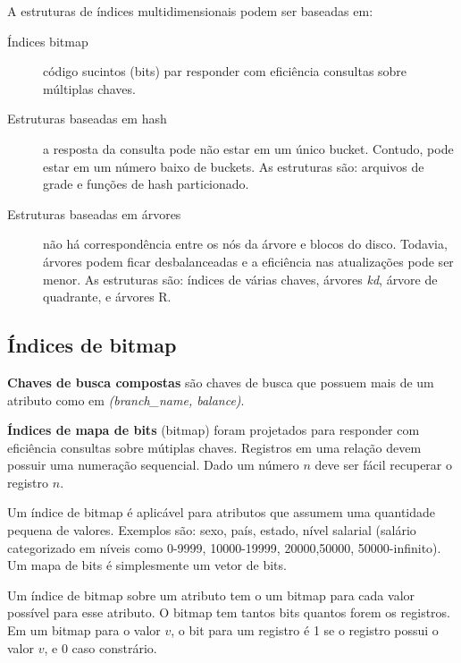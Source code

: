 A estruturas de índices multidimensionais podem ser baseadas em:
\begin{description}
\item[Índices bitmap] código sucintos (bits) par responder com eficiência 
consultas sobre múltiplas chaves.

\item[Estruturas baseadas em hash] a resposta da consulta pode não estar em um único bucket.
Contudo, pode estar em um número baixo de buckets. As estruturas são: arquivos
de grade e funções de hash particionado.

\item[Estruturas baseadas em árvores] não há correspondência entre os nós da árvore e blocos do disco.
Todavia, árvores podem ficar desbalanceadas e a eficiência nas atualizações
pode ser menor.
As estruturas são: índices de várias chaves, árvores \emph{kd}, árvore de quadrante,
e árvores R.
\end{description}

\subsection{Índices de bitmap}

\textbf{Chaves de busca compostas} são chaves de busca que possuem
mais de um atributo como em \emph{(branch\_name, balance)}.

\textbf{Índices de mapa de bits} (bitmap) foram projetados para responder com
eficiência consultas sobre mútiplas chaves.
Registros em uma relação devem possuir uma numeração sequencial. 
Dado um número $n$ deve ser fácil recuperar o registro $n$.

Um índice de bitmap é aplicável para atributos que assumem uma quantidade pequena de valores.
Exemplos são: sexo, país, estado, nível salarial (salário categorizado em níveis como 
0-9999, 10000-19999, 20000,50000, 50000-infinito).
Um mapa de bits é simplesmente um vetor de bits.

Um índice de bitmap sobre um atributo tem o um bitmap para cada valor possível
para esse atributo.
O bitmap tem tantos bits quantos forem os registros. 
Em um bitmap para o valor $v$, o bit para um registro é 1 se o 
registro possui o valor $v$, e 0 caso constrário.

